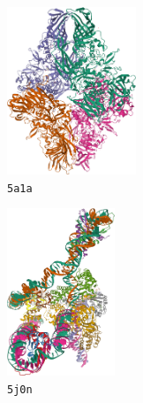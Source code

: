 
\begin{figure}[ht!]
    \centering
    \begin{minipage}[b]{0.55\linewidth}
        \centering
        \begin{subfigure}[b]{0.49\linewidth}
            \centering
            \includegraphics[height=5cm]{figures/5a1a_pdb.png}
            \caption*{\texttt{5a1a}}
        \end{subfigure}
        \hfill
        \begin{subfigure}[b]{0.42\linewidth}
            \centering
            \includegraphics[height=5cm]{figures/5j0n_pdb.png}
            \caption*{\texttt{5j0n}}
        \end{subfigure}
        \caption{%
            Ground-truth proteins: the $\beta$-galactosidase (\texttt{5a1a})~\cite{5a1a_pdb}, and the lambda excision HJ intermediate (\texttt{5j0n})~\cite{5j0n_pdb}.
        }\label{fig:pdb-proteins}
    \end{minipage}
    \hfill
    \begin{minipage}[b]{0.35\linewidth}
        \centering
        \begin{subfigure}[b]{0.49\linewidth}
            \centering

\end{subfigure}
\end{minipage}
\end{figure}
